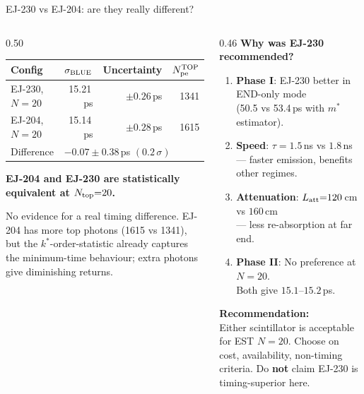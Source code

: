 \documentclass[aspectratio=169,9pt]{beamer}
\begin{document}
\begin{frame}{EJ-230 vs EJ-204: are they really different?}
\begin{columns}[T]
\begin{column}{0.50\textwidth}
\footnotesize
\renewcommand{\arraystretch}{1.3}
\begin{tabular}{lrrr}
\toprule
Config & $\sigma_{\rm BLUE}$ & Uncertainty & $N_{\rm pe}^{\rm TOP}$\\
\midrule
EJ-230, $N{=}20$ & 15.21\,ps & $\pm0.26$\,ps & 1341\\
EJ-204, $N{=}20$ & 15.14\,ps & $\pm0.28$\,ps & 1615\\
\midrule
Difference & \multicolumn{3}{l}{$-0.07\pm0.38$\,ps \quad $(0.2\,\sigma)$}\\
\bottomrule
\end{tabular}

\vspace{0.5em}
\begin{center}
\normalsize\textbf{EJ-204 and EJ-230 are statistically\\equivalent at $N_{\rm top}{=}20$.}
\end{center}

\vspace{0.3em}
\footnotesize
No evidence for a real timing difference.
EJ-204 has more top photons (1615 vs 1341),
but the $k^*$-order-statistic already captures
the minimum-time behaviour; extra photons
give diminishing returns.
\end{column}

\begin{column}{0.46\textwidth}
\footnotesize
\textbf{Why was EJ-230 recommended?}\\[0.3em]
\begin{enumerate}
  \item \textbf{Phase I}: EJ-230 better in END-only mode\\
        (50.5 vs 53.4\,ps with $m^*$ estimator).
  \item \textbf{Speed}: $\tau{=}1.5$\,ns vs $1.8$\,ns\\
        — faster emission, benefits other regimes.
  \item \textbf{Attenuation}: $L_{\rm att}{=}120$\,cm vs $160$\,cm\\
        — less re-absorption at far end.
  \item \textbf{Phase II}: No preference at $N{=}20$.\\
        Both give $15.1$--$15.2$\,ps.
\end{enumerate}

\vspace{0.4em}
\normalsize
\textbf{Recommendation:}\\
\footnotesize
Either scintillator is acceptable for EST $N{=}20$.
Choose on cost, availability, non-timing criteria.
Do \textbf{not} claim EJ-230 is timing-superior here.
\end{column}
\end{columns}
\end{frame}
\end{document}
